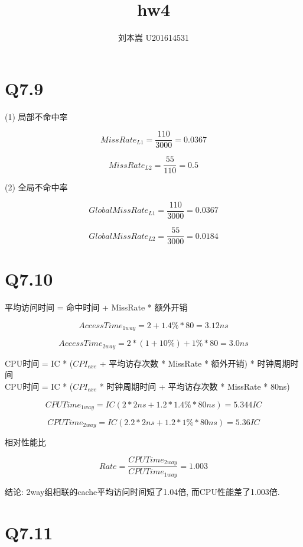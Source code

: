 \documentclass{article}
\begin{document}
\begin{CJK}{UTF8}{gbsn}

\title{hw4}
\author{刘本嵩 U201614531}

\maketitle


\section{Q7.9}
\Large
\smallskip

(1) 局部不命中率

$$MissRate_{L1} = \frac{110}{3000} = 0.0367$$

$$MissRate_{L2} = \frac{55}{110} = 0.5$$

(2) 全局不命中率

$$GlobalMissRate_{L1} = \frac{110}{3000} = 0.0367$$

$$GlobalMissRate_{L2} = \frac{55}{3000} = 0.0184$$

\section{Q7.10}
\Large
\smallskip

平均访问时间 = 命中时间 + MissRate * 额外开销

$$ AccessTime_{1way} = 2 + 1.4\% * 80 = 3.12ns $$

$$ AccessTime_{2way} = 2 * (1+10\%) + 1\% * 80 = 3.0ns $$

CPU时间 = IC * ($CPI_{exe}$ + 平均访存次数 * MissRate * 额外开销) * 时钟周期时间 \\

CPU时间 = IC * ($CPI_{exe}$ * 时钟周期时间 + 平均访存次数 * MissRate * 80ns)

$$ CPUTime_{1way} = IC (2 * 2ns + 1.2 * 1.4\% * 80ns) = 5.344IC $$

$$ CPUTime_{2way} = IC (2.2 * 2ns + 1.2 * 1\% * 80ns) = 5.36IC $$

相对性能比

$$ Rate = \frac{CPUTime_{2way}}{CPUTime_{1way}} = 1.003 $$

结论: 2way组相联的cache平均访问时间短了1.04倍, 而CPU性能差了1.003倍.

\section{Q7.11}
\Large
\smallskip


\end{CJK}
\end{document}
